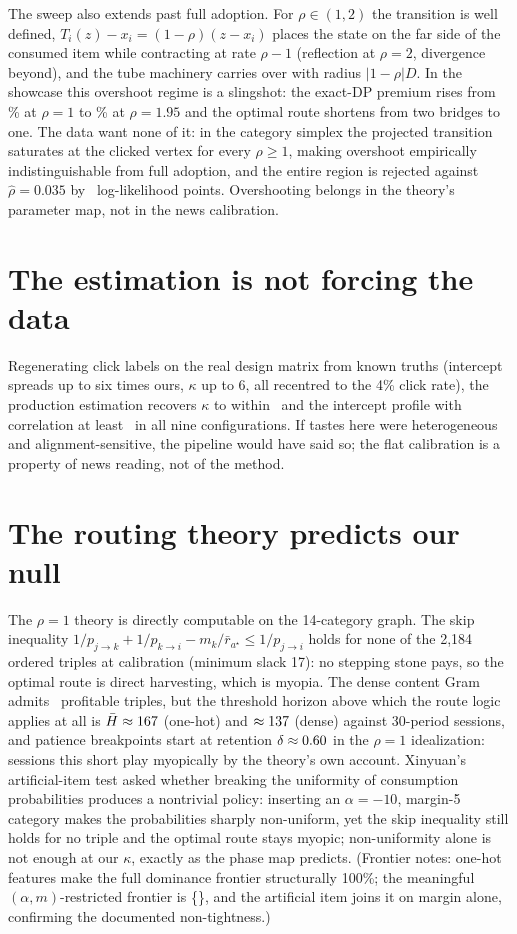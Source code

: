 \documentclass[11pt]{article}
\begin{document}
The sweep also extends past full adoption. For $\rho\in(1,2)$ the
transition is well defined, $T_i(z)-x_i=(1-\rho)(z-x_i)$ places the state
on the far side of the consumed item while contracting at rate $\rho-1$
(reflection at $\rho=2$, divergence beyond), and the tube machinery
carries over with radius $|1-\rho|D$. In the showcase this overshoot
regime is a slingshot: the exact-DP premium rises from \osToyOne\% at
$\rho=1$ to \osToyMax\% at $\rho=1.95$ and the optimal route shortens
from two bridges to one. The data want none of it: in the category
simplex the projected transition saturates at the clicked vertex for
every $\rho\ge1$, making overshoot empirically indistinguishable from
full adoption, and the entire region is rejected against
$\hat\rho=0.035$ by \osDrop\ log-likelihood points. Overshooting belongs
in the theory's parameter map, not in the news calibration.

\section{The estimation is not forcing the data}

Regenerating click labels on the real design matrix from known truths
(intercept spreads up to six times ours, $\kappa$ up to 6, all recentred
to the 4\% click rate), the production estimation recovers $\kappa$ to
within \recKerr\ and the intercept profile with correlation at least
\recCorr\ in all nine configurations. If tastes here were heterogeneous
and alignment-sensitive, the pipeline would have said so; the flat
calibration is a property of news reading, not of the method.

\section{The routing theory predicts our null}

The $\rho=1$ theory is directly computable on the 14-category graph. The
skip inequality
$1/p_{j\to k}+1/p_{k\to i}-m_k/\bar r_{a^\star}\le 1/p_{j\to i}$ holds for
none of the 2{,}184 ordered triples at calibration (minimum slack 17): no
stepping stone pays, so the optimal route is direct harvesting, which is
myopia. The dense content Gram admits \gBridgesDense\ profitable triples,
but the threshold horizon above which the route logic applies at all is
$\bar H\approx167$ (one-hot) and $\approx137$ (dense)
against 30-period sessions, and patience
breakpoints start at retention $\delta\approx0.60$ in the $\rho=1$
idealization: sessions this short play myopically by the theory's own
account. Xinyuan's artificial-item test asked whether breaking the uniformity
of consumption probabilities produces a nontrivial policy: inserting an
$\alpha=-10$, margin-5 category makes the probabilities sharply
non-uniform, yet the skip inequality still holds for no triple and the
optimal route stays myopic; non-uniformity alone is not enough at our
$\kappa$, exactly as the phase map predicts. (Frontier notes: one-hot
features make the full dominance frontier structurally 100\%; the
meaningful $(\alpha,m)$-restricted frontier is \{\gFrontierAM\}, and
the artificial item joins it on margin alone, confirming the documented
non-tightness.)
\end{document}
